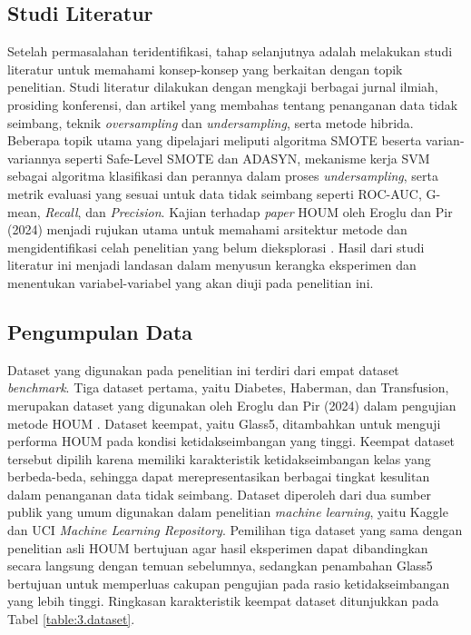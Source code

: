 \subsection{Studi Literatur} \label{III.Studi_literatur}
Setelah permasalahan teridentifikasi, tahap selanjutnya adalah melakukan studi literatur untuk memahami konsep-konsep yang berkaitan dengan topik penelitian. Studi literatur dilakukan dengan mengkaji berbagai jurnal ilmiah, prosiding konferensi, dan artikel yang membahas tentang penanganan data tidak seimbang, teknik \textit{oversampling} dan \textit{undersampling}, serta metode hibrida. Beberapa topik utama yang dipelajari meliputi algoritma SMOTE beserta varian-variannya seperti Safe-Level SMOTE dan ADASYN, mekanisme kerja SVM sebagai algoritma klasifikasi dan perannya dalam proses \textit{undersampling}, serta metrik evaluasi yang sesuai untuk data tidak seimbang seperti ROC-AUC, G-mean, \textit{Recall}, dan \textit{Precision}. Kajian terhadap \textit{paper} HOUM oleh Eroglu dan Pir (2024) menjadi rujukan utama untuk memahami arsitektur metode dan mengidentifikasi celah penelitian yang belum dieksplorasi \cite{Eroglu2024HOUM}. Hasil dari studi literatur ini menjadi landasan dalam menyusun kerangka eksperimen dan menentukan variabel-variabel yang akan diuji pada penelitian ini.

\subsection{Pengumpulan Data} \label{III.Pengumpulan_data}
Dataset yang digunakan pada penelitian ini terdiri dari empat dataset \textit{benchmark}. Tiga dataset pertama, yaitu Diabetes, Haberman, dan Transfusion, merupakan dataset yang digunakan oleh Eroglu dan Pir (2024) dalam pengujian metode HOUM \cite{Eroglu2024HOUM}. Dataset keempat, yaitu Glass5, ditambahkan untuk menguji performa HOUM pada kondisi ketidakseimbangan yang tinggi. Keempat dataset tersebut dipilih karena memiliki karakteristik ketidakseimbangan kelas yang berbeda-beda, sehingga dapat merepresentasikan berbagai tingkat kesulitan dalam penanganan data tidak seimbang. Dataset diperoleh dari dua sumber publik yang umum digunakan dalam penelitian \textit{machine learning}, yaitu Kaggle dan UCI \textit{Machine Learning Repository}. Pemilihan tiga dataset yang sama dengan penelitian asli HOUM bertujuan agar hasil eksperimen dapat dibandingkan secara langsung dengan temuan sebelumnya, sedangkan penambahan Glass5 bertujuan untuk memperluas cakupan pengujian pada rasio ketidakseimbangan yang lebih tinggi. Ringkasan karakteristik keempat dataset ditunjukkan pada Tabel \ref{table:3.dataset}.

